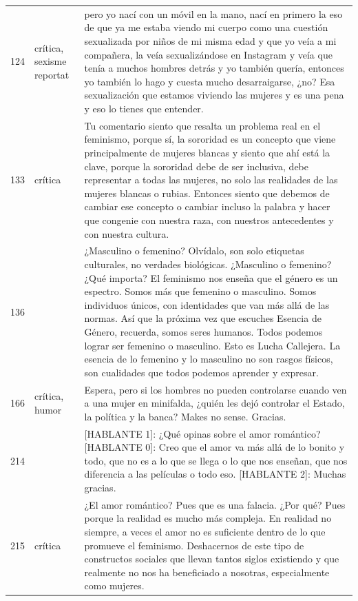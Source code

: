 \begin{longtable}{c>{\raggedright}p{2.0cm}p{12.1cm}}
124 & crítica, sexisme reportat & pero yo nací con un móvil en la mano, nací en primero la eso de que ya me estaba viendo mi cuerpo como una cuestión sexualizada por niños de mi misma edad y que yo veía a mi compañera, la veía sexualizándose en Instagram y veía que tenía a muchos hombres detrás y yo también quería, entonces yo también lo hago y cuesta mucho desarraigarse, ¿no? Esa sexualización que estamos viviendo las mujeres y es una pena y eso lo tienes que entender. \\
133 & crítica & Tu comentario siento que resalta un problema real en el feminismo, porque sí, la sororidad es un concepto que viene principalmente de mujeres blancas y siento que ahí está la clave, porque la sororidad debe de ser inclusiva, debe representar a todas las mujeres, no solo las realidades de las mujeres blancas o rubias. Entonces siento que debemos de cambiar ese concepto o cambiar incluso la palabra y hacer que congenie con nuestra raza, con nuestros antecedentes y con nuestra cultura. \\
136 &  & ¿Masculino o femenino? Olvídalo, son solo etiquetas culturales, no verdades biológicas. ¿Masculino o femenino? ¿Qué importa? El feminismo nos enseña que el género es un espectro. Somos más que femenino o masculino. Somos individuos únicos, con identidades que van más allá de las normas. Así que la próxima vez que escuches Esencia de Género, recuerda, somos seres humanos. Todos podemos lograr ser femenino o masculino. Esto es Lucha Callejera. La esencia de lo femenino y lo masculino no son rasgos físicos, son cualidades que todos podemos aprender y expresar. \\
166 & crítica, humor & Espera, pero si los hombres no pueden controlarse cuando ven a una mujer en minifalda, ¿quién les dejó controlar el Estado, la política y la banca? Makes no sense. Gracias. \\
214 &  & [HABLANTE 1]: ¿Qué opinas sobre el amor romántico?
[HABLANTE 0]: Creo que el amor va más allá de lo bonito y todo, que no es a lo que se llega o lo que nos enseñan, que nos diferencia a las películas o todo eso.
[HABLANTE 2]: Muchas gracias. \\
215 & crítica & ¿El amor romántico? Pues que es una falacia. ¿Por qué? Pues porque la realidad es mucho más compleja. En realidad no siempre, a veces el amor no es suficiente dentro de lo que promueve el feminismo. Deshacernos de este tipo de constructos sociales que llevan tantos siglos existiendo y que realmente no nos ha beneficiado a nosotras, especialmente como mujeres. \\

\end{longtable}
